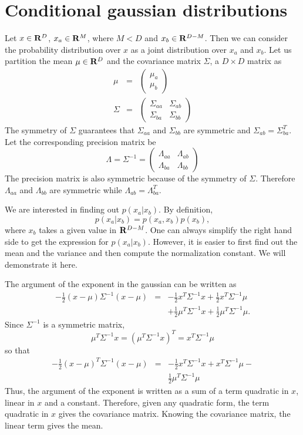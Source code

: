 \section{Conditional gaussian distributions}\label{c2s2}
Let $x \in \mathbf{R}^D$, $x_a \in \mathbf{R}^M$, where $M < D$ and $x_b \in \mathbf{R}^{D-M}$. Then we can consider 
the probability distribution over $x$ as a joint distribution over $x_a$ and $x_b$. Let us partition
the mean $\mu \in \mathbf{R}^D$ and the covariance matrix $\Sigma$, a $D \times D$ matrix as
\begin{eqnarray}
\mu &=& \begin{pmatrix} \mu_a \\ \mu_b \end{pmatrix} \label{c2s2e1} \\
\Sigma &=& \begin{pmatrix} \Sigma_{aa} & \Sigma_{ab} \\ \Sigma_{ba} & \Sigma_{bb} \end{pmatrix} \label{c2s2e2}
\end{eqnarray}
The symmetry of $\Sigma$ guarantees that $\Sigma_{aa}$ and $\Sigma_{bb}$ are symmetric and 
$\Sigma_{ab} = \Sigma_{ba}^T$. Let the corresponding precision matrix be 
\begin{equation}\label{c2s2e3}
\Lambda = \Sigma^{-1} = \begin{pmatrix} \Lambda_{aa} & \Lambda_{ab} \\ \Lambda_{ba} & \Lambda_{bb} \end{pmatrix} 
\end{equation}
The precision matrix is also symmetric because of the symmetry of $\Sigma$. Therefore $\Lambda_{aa}$
and $\Lambda_{bb}$ are symmetric while $\Lambda_{ab} = \Lambda_{ba}^T$. 

We are interested in finding out $p(x_a|x_b)$. By definition, 
\[
p(x_a|x_b) = p(x_a, x_b)p(x_b),
\]
where $x_b$ takes a given value in $\mathbf{R}^{D-M}$. One can always simplify the right hand side to get
the expression for $p(x_a|x_b)$. However, it is easier to first find out the mean and the variance
and then compute the normalization constant. We will demonstrate it here.

The argument of the exponent in the gaussian can be written as
\begin{eqnarray*}
-\frac{1}{2}(x-\mu)\Sigma^{-1}(x - \mu) &=& -\frac{1}{2}x^T\Sigma^{-1}x + \frac{1}{2}x^T\Sigma^{-1}\mu \\
 & & + \frac{1}{2}\mu^T\Sigma^{-1}x + \frac{1}{2}\mu^T\Sigma^{-1}\mu.
\end{eqnarray*}
Since $\Sigma^{-1}$ is a symmetric matrix,
\[
\mu^T\Sigma^{-1}x = \left(\mu^T\Sigma^{-1}x\right)^T = x^T\Sigma^{-1}\mu
\]
so that
\begin{eqnarray*}
-\frac{1}{2}(x-\mu)^T\Sigma^{-1}(x-\mu) &=& -\frac{1}{2}x^T\Sigma^{-1}x + x^T\Sigma^{-1}\mu - \\
 & & \frac{1}{2}\mu^T\Sigma^{-1}\mu
\end{eqnarray*}
Thus, the argument of the exponent is written as a sum of a term quadratic in $x$, linear in $x$
and a constant. Therefore, given any quadratic form, the term quadratic in $x$ gives the
covariance matrix. Knowing the covariance matrix, the linear term gives the mean.

